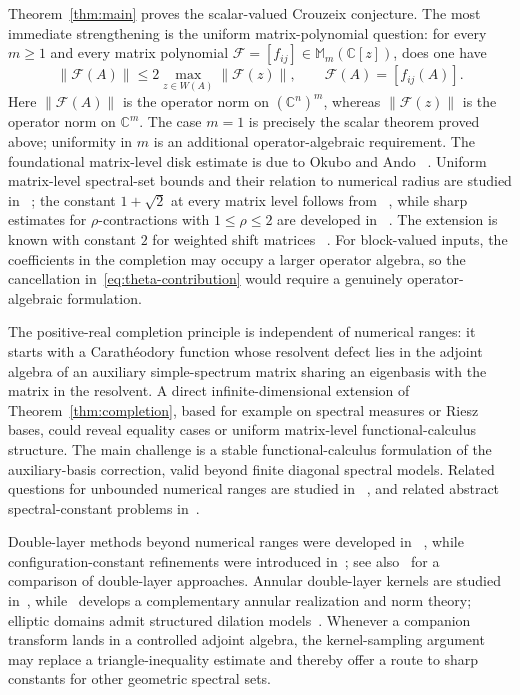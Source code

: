 \documentclass[preprints,article,submit,oneauthor]{Definitions/mdpi}
\theoremstyle{mdpi}
\theoremstyle{definition}
\newcommand{\C}{\mathbb C}
\begin{document}
Theorem~\ref{thm:main} proves the scalar-valued Crouzeix
conjecture.  The most immediate strengthening is the uniform
matrix-polynomial question: for every
$m\geq1$ and every matrix polynomial
$\mathcal F=[f_{ij}]\in\mathbb M_m(\C[z])$, does one have
\begin{equation}
  \lVert\mathcal F(A)\rVert
  \leq2\max_{z\in W(A)}\lVert\mathcal F(z)\rVert,
  \qquad \mathcal F(A)=[f_{ij}(A)].
  \label{eq:uniform-matrix-polynomial-extension}
\end{equation}
Here $\lVert\mathcal F(A)\rVert$ is the operator norm on $(\C^n)^m$,
whereas $\lVert\mathcal F(z)\rVert$ is the operator norm on $\C^m$.
The case $m=1$ is precisely the scalar theorem proved above;
uniformity in $m$ is an additional operator-algebraic requirement.  The
foundational matrix-level disk estimate is due to Okubo and Ando~%
\cite{OkuboAndo1975}.  Uniform matrix-level spectral-set bounds and
their relation to numerical radius are studied in~%
\cite{DavidsonPaulsenWoerdeman2018,HartzMcCarthy2026}; the constant
$1+\sqrt2$ at every matrix level follows from~%
\cite{CrouzeixPalencia2017}, while sharp estimates for
$\rho$-contractions with $1\leq\rho\leq2$ are developed in~%
\cite{SchwenningerDeVriesRho2025}.  The extension is
known with constant $2$ for weighted shift matrices~%
\cite{CrouzeixGreenbaum2025}.  For block-valued inputs, the coefficients
in the completion may occupy a larger operator algebra, so the
cancellation in~\eqref{eq:theta-contribution} would require a genuinely
operator-algebraic formulation.

The positive-real completion principle is independent of numerical
ranges: it starts with a Carath\'eodory function whose resolvent defect
lies in the adjoint algebra of an auxiliary simple-spectrum matrix
sharing an eigenbasis with the matrix in the resolvent.  A direct
infinite-dimensional extension of Theorem~\ref{thm:completion},
based for example on spectral measures or Riesz bases, could reveal
equality cases or uniform matrix-level functional-calculus structure.
The main challenge is a stable functional-calculus formulation of the
auxiliary-basis correction, valid beyond finite diagonal spectral
models.
Related questions for unbounded numerical ranges are studied in~%
\cite{CrouzeixUnbounded2025}, and related abstract spectral-constant
problems in~\cite{SchwenningerDeVries2024,BlazhkoEtAl2025}.

Double-layer methods beyond numerical ranges were developed in~%
\cite{CrouzeixGreenbaum2019}, while configuration-constant refinements
were introduced in~\cite{MalmanEtAl2025}; see also~%
\cite{SchwenningerDeVries2025} for a comparison of double-layer
approaches.
Annular double-layer kernels are studied in~\cite{JuryTsikalas2024},
while~\cite{AglerLykovaYoung2025} develops a complementary annular
realization and norm theory; elliptic domains admit structured dilation
models~\cite{AglerLykovaYoung2024}.  Whenever a companion transform
lands in a controlled adjoint algebra, the kernel-sampling argument may
replace a triangle-inequality estimate and thereby offer a route to
sharp constants for other geometric spectral sets.
\end{document}
